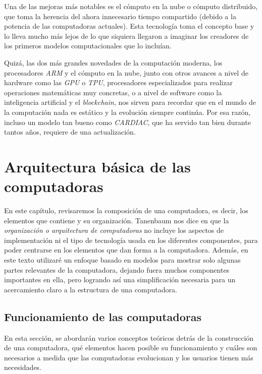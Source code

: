 \documentclass[letterpaper,12pt,oneside]{book}
\begin{document}
        Una de las mejoras más notables es el cómputo en la nube o 
		cómputo distribuido, que toma la 
		herencia del ahora innecesario tiempo compartido (debido a la potencia de las computadoras actuales). Esta tecnología toma el concepto base y lo lleva mucho más lejos de lo que siquiera 
		llegaron a imaginar los creadores de los primeros modelos computacionales que lo incluían.
		
		Quizá, las dos más grandes novedades de la computación moderna, los procesadores \textit{ARM} y el cómputo en la nube, junto con otros avances a nivel de hardware
		como las \textit{GPU} o \textit{TPU}, procesadores especializados para realizar operaciones matemáticas muy concretas, o a nivel de software como
		la inteligencia artificial y el \textit{blockchain}, nos sirven para recordar que en el mundo de la computación nada es estático y la evolución siempre continúa. Por esa razón, incluso un modelo tan bueno como \textit{CARDIAC}, que ha servido tan bien durante tantos años, requiere de una actualización.
		\clearpage			
		 
\clearpage	

\chapter{Arquitectura básica de las computadoras} %

En este capítulo, revisaremos la composición de una computadora, es decir, los elementos que contiene y su organización. Tanenbaum nos dice en \cite{tanenbaum_structured_2013} que la  \textit{organización o arquitectura de computadoras}
no incluye los aspectos de implementación ni el tipo de tecnología usada en los diferentes componentes, para poder centrarse en los
elementos que dan forma a la computadora. Además, en este texto utilizaré un enfoque basado en modelos para mostrar solo algunas partes relevantes
de la computadora, dejando fuera muchos componentes importantes en ella, pero logrando así una simplificación necesaria para un acercamiento
claro a la estructura de una computadora.

\section{Funcionamiento de las computadoras}   %
	
	En esta sección, se abordarán varios conceptos teóricos detrás de la construcción de una computadora, qué elementos hacen posible su funcionamiento
	y cuáles son necesarios a medida que las computadoras evolucionan y los usuarios tienen más necesidades.
\end{document}
